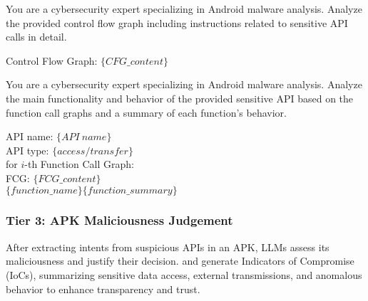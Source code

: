 \begin{tcolorbox}[title=Tier 1: Function Behavior Summarization Prompt, 
left=2pt, %
right=2pt, %
top=3pt, %
bottom=3pt, %
fonttitle=\small,colback=gray!20, colframe=black, colbacktitle=black, coltitle=white, sharp corners, fontupper=\small, fontlower=\small, before upper=\raggedright, before lower=\raggedright]
You are a cybersecurity expert specializing in Android malware analysis. Analyze the provided control flow graph including instructions related to sensitive API calls in detail.

Control Flow Graph: $\{CFG\_content\}$
\end{tcolorbox}

\begin{tcolorbox}[title=Tier 2: API Intent Awareness Prompt, 
left=2pt, %
right=2pt, %
top=3pt, %
bottom=3pt, %
fonttitle=\small,colback=gray!20, colframe=black, colbacktitle=black, coltitle=white, sharp corners, fontupper=\small, fontlower=\small, before upper=\raggedright, before lower=\raggedright]
You are a cybersecurity expert specializing in Android malware analysis. Analyze the main functionality and behavior of the provided sensitive API based on the function call graphs and a summary of each function's behavior.

API name: $\{API\ name\}$ \\
API type: $\{access/transfer\}$\\
for $i$-th Function Call Graph: \\
\makebox[2em]{} FCG: $\{FCG\_content\}$ \\
\makebox[2em]{} $\{function\_name\} \{function\_summary\}$ 
\end{tcolorbox}



\subsubsection{Tier 3: APK Maliciousness Judgement}
After extracting intents from suspicious APIs in an APK, LLMs assess its maliciousness and justify their decision. and generate Indicators of Compromise (IoCs), summarizing sensitive data access, external transmissions, and anomalous behavior to enhance transparency and trust.



